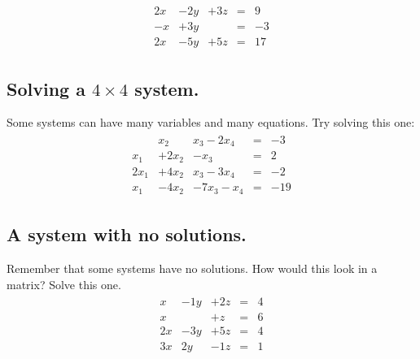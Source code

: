 \documentclass[12pt,fleqn]{book}
\begin{document}
\begin{align*}
\begin{array}{rrrrr}
	2 x&- 2y & +3z&=&9 \\
	- x&+ 3y &    &=&-3 \\
	2 x&- 5y & +5z&=&17
\end{array}
\end{align*}
\clearpage
\subsection*{Solving a $4\times 4$ system.}
Some systems can have many variables and many equations.  Try solving this one:
\begin{align*}
\begin{array}{rrrrrr}
	       &   x_{2} &   x_{3}-2x_{4}&=&-3 \\
	  x_{1}&+ 2x_{2} & - x_{3}       &=& 2 \\
	 2x_{1}&+ 4x_{2} &   x_{3}-3x_{4}&=&-2 \\
	  x_{1}&- 4x_{2} &-7 x_{3}- x_{4}&=&-19
\end{array}
\end{align*}
\clearpage
\subsection*{A system with no solutions.}
Remember that some systems have no solutions.  How would this look in a matrix? Solve this one.
\begin{align*}
\begin{array}{rrrrr}
	  x&- 1y & +2z&=&4 \\
	  x&     &  +z&=&6 \\
	2 x&- 3y & +5z&=&4 \\
	3 x&  2y & -1z&=&1
\end{array}
\end{align*}
\clearpage
\end{document}
